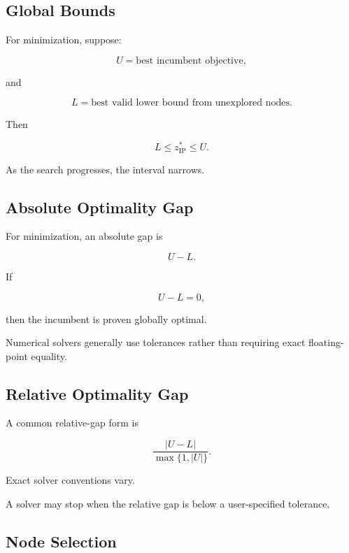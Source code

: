 \subsection{Global Bounds}
\label{subsec:integer-global-bounds}

For minimization, suppose:

\[
U
=
\text{best incumbent objective},
\]

and

\[
L
=
\text{best valid lower bound from unexplored nodes}.
\]

Then

\[
\boxed{
L
\leq
z_{\mathrm{IP}}^*
\leq
U.
}
\]

As the search progresses, the interval narrows.

\subsection{Absolute Optimality Gap}
\label{subsec:absolute-mip-gap}

For minimization, an absolute gap is

\[
\boxed{
U-L.
}
\]

If

\[
\boxed{
U-L=0,
}
\]

then the incumbent is proven globally optimal.

Numerical solvers generally use tolerances rather than requiring exact
floating-point equality.

\subsection{Relative Optimality Gap}
\label{subsec:relative-mip-gap}

A common relative-gap form is

\[
\boxed{
\frac{
|U-L|
}{
\max
\{
1,|U|
\}
}.
}
\]

Exact solver conventions vary.

A solver may stop when the relative gap is below a user-specified
tolerance.

\subsection{Node Selection}
\label{subsec:branch-bound-node-selection}

